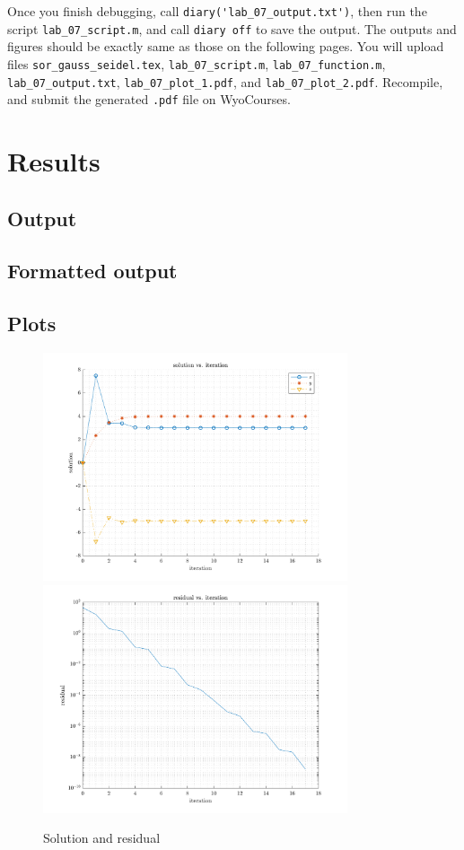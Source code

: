 Once you finish debugging, call \verb|diary('lab_07_output.txt')|, then run the script \verb|lab_07_script.m|, and call \verb|diary off| to save the output. The outputs and figures should be exactly same as those on the following pages. You will upload files \verb|sor_gauss_seidel.tex|, \verb|lab_07_script.m|, \verb|lab_07_function.m|, \verb|lab_07_output.txt|, \verb|lab_07_plot_1.pdf|, and \verb|lab_07_plot_2.pdf|. Recompile, and submit the generated \verb|.pdf| file on WyoCourses.

\newpage

\section{Results}

\subsection{Output}



\subsection{Formatted output}



\newpage

\subsection{Plots}
\begin{figure}[!hbtp]
    \centering
    \includegraphics[width=0.80\textwidth]{../Math.3341.Lab.07.ans/lab_07_plot_1.pdf}
    \includegraphics[width=0.80\textwidth]{../Math.3341.Lab.07.ans/lab_07_plot_2.pdf}
    \caption{Solution and residual}
    \label{fig:sol}
\end{figure}

